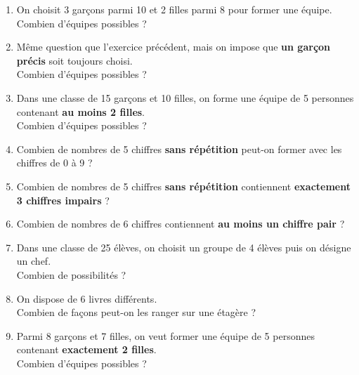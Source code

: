 \documentclass[12pt]{article}
\begin{document}
\begin{enumerate}[label=\textbf{Exercice \arabic*.}]
\vspace{0.3cm}

\item On choisit 3 garçons parmi 10 et 2 filles parmi 8 pour former une équipe.\\
Combien d’équipes possibles ?

\vspace{0.3cm}

\item Même question que l’exercice précédent, mais on impose que \textbf{un garçon précis} soit toujours choisi.\\
Combien d’équipes possibles ?

\vspace{0.3cm}

\item Dans une classe de 15 garçons et 10 filles, on forme une équipe de 5 personnes contenant \textbf{au moins 2 filles}.\\
Combien d’équipes possibles ?

\item Combien de nombres de 5 chiffres \textbf{sans répétition} peut-on former avec les chiffres de 0 à 9 ?

\vspace{0.3cm}

\item Combien de nombres de 5 chiffres \textbf{sans répétition} contiennent \textbf{exactement 3 chiffres impairs} ?

\vspace{0.3cm}

\item Combien de nombres de 6 chiffres contiennent \textbf{au moins un chiffre pair} ?

\vspace{0.3cm}

\item Dans une classe de 25 élèves, on choisit un groupe de 4 élèves puis on désigne un chef.\\
Combien de possibilités ?

\vspace{0.3cm}

\item On dispose de 6 livres différents.\\
Combien de façons peut-on les ranger sur une étagère ?

\vspace{0.3cm}

\item Parmi 8 garçons et 7 filles, on veut former une équipe de 5 personnes contenant \textbf{exactement 2 filles}.\\
Combien d’équipes possibles ?


\end{enumerate}
\end{document}
